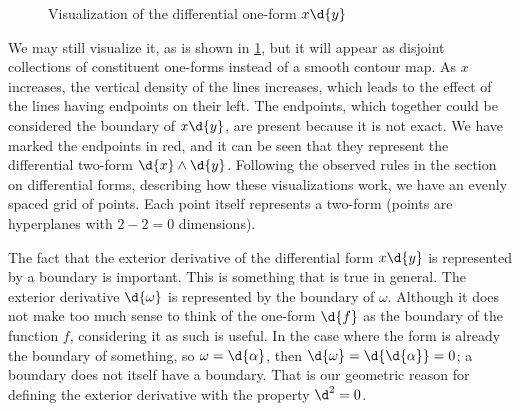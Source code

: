 \documentclass[a4paper,12pt]{article}
\begin{document}
\begin{figure}[!htbp]
\centering
{}
\caption{Visualization of the differential one-form $x\d{y}$}
\label{fig:oneform_xdy}
\end{figure}

We may still visualize it, as is shown in \cref{fig:oneform_xdy}, but it will appear as disjoint collections of constituent one-forms instead of a smooth contour map.
As $x$ increases, the vertical density of the lines increases, which leads to the effect of the lines having endpoints on their left.
The endpoints, which together could be considered the boundary of $x\d{y}$, are present because it is not exact.
We have marked the endpoints in red, and it can be seen that they represent the differential two-form $\d{x} \wedge \d{y}$.
Following the observed rules in the section on differential forms, describing how these visualizations work, we have an evenly spaced grid of points.
Each point itself represents a two-form (points are hyperplanes with $2 - 2 = 0$ dimensions).

The fact that the exterior derivative of the differential form $x\d{y}$ is represented by a boundary is important.
This is something that is true in general.
The exterior derivative $\d{\omega}$ is represented by the boundary of $\omega$.
Although it does not make too much sense to think of the one-form $\d{f}$ as the boundary of the function $f$, considering it as such is useful.
In the case where the form is already the boundary of something, so $\omega = \d{\alpha}$, then $\d{\omega} = \d{\d{\alpha}} = 0$; a boundary does not itself have a boundary.
That is our geometric reason for defining the exterior derivative with the property $\d^2 = 0$.
\end{document}
